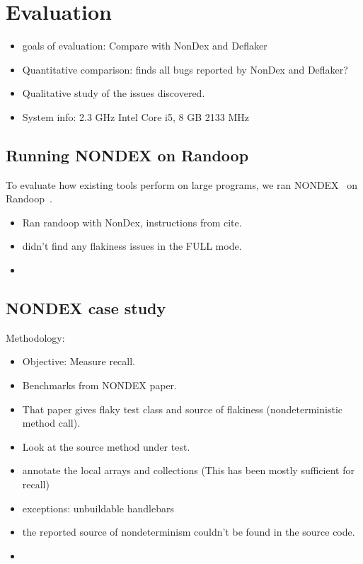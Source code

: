 \section{Evaluation}
\begin{itemize}
    \item goals of evaluation: Compare with NonDex and Deflaker
    \item Quantitative comparison: \theDeterminismChecker finds all bugs reported by NonDex and Deflaker?
    \item Qualitative study of the issues discovered.
    \item System info: 2.3 GHz Intel Core i5, 8 GB 2133 MHz
\end{itemize}

\subsection{Running NONDEX on Randoop}
To evaluate how existing tools perform on large programs, we ran NONDEX~\cite{nondex-tool} on Randoop~\cite{randoop-tool}.
\begin{itemize} 
    \item Ran randoop with NonDex, instructions from cite.
    \item didn't find any flakiness issues in the FULL mode.
    \item {}
\end{itemize}

\subsection{NONDEX case study}
Methodology:
\begin{itemize}
    \item Objective: Measure recall.
    \item Benchmarks from NONDEX paper.
    \item That paper gives flaky test class and source of flakiness (nondeterministic method call).
    \item Look at the source method under test.
    \item annotate the local arrays and collections (This has been mostly sufficient for recall)
    \item exceptions: unbuildable handlebars
    \item the reported source of nondeterminism couldn't be found in the source code.
    \item {}
\end{itemize}

